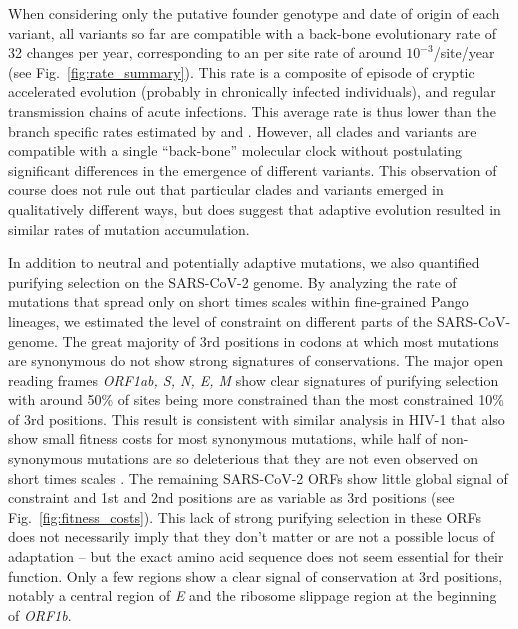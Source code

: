 \documentclass[aps,rmp, twocolumn]{revtex4}
\begin{document}
When considering only the putative founder genotype and date of origin of each variant, all variants so far are compatible with a back-bone evolutionary rate of 32 changes per year, corresponding to an per site rate of around $10^{-3}$/site/year (see Fig.~\ref{fig:rate_summary}).
This rate is a composite of episode of cryptic accelerated evolution (probably in chronically infected individuals), and regular transmission chains of acute infections.
This average rate is thus lower than the branch specific rates estimated by \citet{hill_origins_2022} and \citet{tay_emergence_2022}.
However, all clades and variants are compatible with a single ``back-bone'' molecular clock without postulating significant differences in the emergence of different variants.
This observation of course does not rule out that particular clades and variants emerged in qualitatively different ways, but does suggest that adaptive evolution resulted in similar rates of mutation accumulation.

In addition to neutral and potentially adaptive mutations, we also quantified purifying selection on the SARS-CoV-2 genome.
By analyzing the rate of mutations that spread only on short times scales within fine-grained Pango lineages, we estimated the level of constraint on different parts of the SARS-CoV-genome.
The great majority of 3rd positions in codons at which  most mutations are synonymous do not show strong signatures of conservations.
The major open reading frames \emph{ORF1ab, S, N, E, M} show clear signatures of purifying selection with around 50\% of sites being more constrained than the most constrained 10\% of 3rd positions.
This result is consistent with similar analysis in HIV-1 that also show small fitness costs for most synonymous mutations, while half of non-synonymous mutations are so deleterious that they are not even observed on short times scales \citep{zanini_vivo_2017}.
The remaining SARS-CoV-2 ORFs show little global signal of constraint and 1st and 2nd positions are as variable as 3rd positions (see Fig.~\ref{fig:fitness_costs}).
This lack of strong purifying selection in these ORFs does not necessarily imply that they don't matter or are not a possible locus of adaptation -- but the exact amino acid sequence does not seem essential for their function.
Only a few regions show a clear signal of conservation at 3rd positions, notably a central region of \emph{E} and the ribosome slippage region at the beginning of \emph{ORF1b}.
\end{document}
